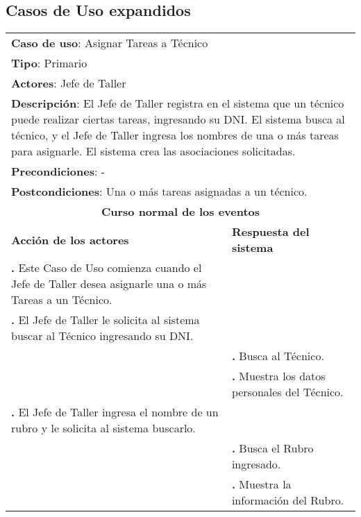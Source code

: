 \documentclass[12pt]{extarticle}
\begin{document}
    \subsection{Casos de Uso expandidos}

    \newcommand\inc{\stepcounter{step}\textbf{\thestep. }}
    \newcommand\resetinc{\setcounter{step}{0}}

    \newcommand\raya{\noindent\rule{169mm}{0.8mm}\\}

	\begin{longtable}{ |p{8cm}|p{8cm}| }
		\hline
		\multicolumn{2}{|p{16cm}|}{\textbf{Caso de uso}: Asignar Tareas a Técnico}\\
		\multicolumn{2}{|p{16cm}|}{\textbf{Tipo}: Primario}\\
		\multicolumn{2}{|p{16cm}|}{\textbf{Actores}: Jefe de Taller}\\
		\multicolumn{2}{|p{16cm}|}{\textbf{Descripción}: El Jefe de Taller registra en el sistema que un técnico puede realizar ciertas tareas, ingresando su DNI. El sistema busca al técnico, y el Jefe de Taller ingresa los nombres de una o más tareas para asignarle. El sistema crea las asociaciones solicitadas.}\\
		\multicolumn{2}{|p{16cm}|}{\textbf{Precondiciones}: - }\\
		\multicolumn{2}{|p{16cm}|}{\textbf{Postcondiciones}: Una o más tareas asignadas a un técnico.}\\
		\hline
		\multicolumn{2}{|c|}{\textbf{Curso normal de los eventos}}\\
		\hline
		\textbf{Acción de los actores} & \textbf{Respuesta del sistema}\\
		\hline
			\inc Este Caso de Uso comienza cuando el Jefe de Taller desea asignarle una o más Tareas a un Técnico.& \\
			\hline
			\inc  El Jefe de Taller le solicita al sistema buscar al Técnico ingresando su DNI.& \\
			\hline
			& \inc Busca al Técnico. \\
			\hline
      & \inc Muestra los datos personales del Técnico. \\
			\hline
			\inc El Jefe de Taller ingresa el nombre de un rubro y le solicita al sistema buscarlo. & \\
			\hline
			& \inc Busca el Rubro ingresado. \\
			\hline
			& \inc Muestra la información del Rubro. \\

\end{longtable}
\end{document}
